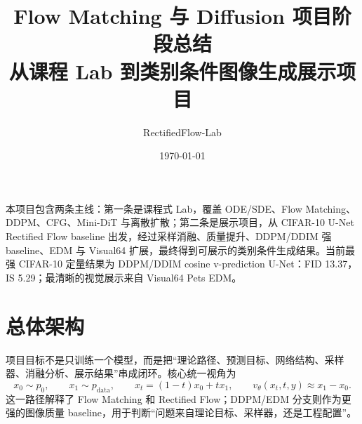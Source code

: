 \documentclass[11pt,a4paper]{ctexart}
\title{\vspace{-1.2cm}\textbf{Flow Matching 与 Diffusion 项目阶段总结}\\
\large 从课程 Lab 到类别条件图像生成展示项目}
\author{RectifiedFlow-Lab}
\date{\today}
\begin{document}
\maketitle

\begin{tcolorbox}[colback=papergray,colframe=paperblue,title=\textbf{项目结论},arc=1mm]
本项目包含两条主线：第一条是课程式 Lab，覆盖 ODE/SDE、Flow Matching、DDPM、CFG、Mini-DiT 与离散扩散；第二条是展示项目，从 CIFAR-10 U-Net Rectified Flow baseline 出发，经过采样消融、质量提升、DDPM/DDIM 强 baseline、EDM 与 Visual64 扩展，最终得到可展示的类别条件生成结果。当前最强 CIFAR-10 定量结果为 DDPM/DDIM cosine v-prediction U-Net：FID 13.37，IS 5.29；最清晰的视觉展示来自 Visual64 Pets EDM。
\end{tcolorbox}

\tableofcontents
\newpage

\section{总体架构}

项目目标不是只训练一个模型，而是把“理论路径、预测目标、网络结构、采样器、消融分析、展示结果”串成闭环。核心统一视角为
\[
  x_0 \sim p_0,\qquad x_1 \sim p_{\mathrm{data}},\qquad
  x_t=(1-t)x_0+t x_1,\qquad
  v_\theta(x_t,t,y)\approx x_1-x_0.
\]
这一路径解释了 Flow Matching 和 Rectified Flow；DDPM/EDM 分支则作为更强的图像质量 baseline，用于判断“问题来自理论目标、采样器，还是工程配置”。
\end{document}
